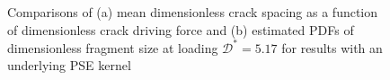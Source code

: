\begin{figure}[htb!]
\begin{subfigure}[b]{0.475\textwidth}
    \caption{}
  \end{subfigure}
  \caption{Comparisons of (a) mean dimensionless crack spacing as a function of dimensionless crack driving force and (b) estimated PDFs of dimensionless fragment size at loading $\mathcal{D}^* = 5.17$ for results with an underlying PSE kernel}
  \label{fig: Chapter4/2D/statistics_sensitivity_sqexp}
\end{figure}

